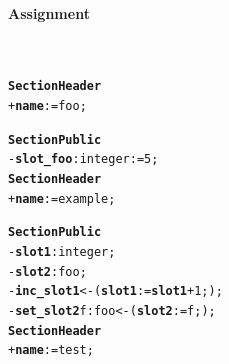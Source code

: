 \documentclass[11pt]{mybook}
\begin{document}
\paragraph{Assignment}  
~\\
\begin{alltt}
{\bf{}Section Header}
  + {\bf{}name} := {\sc{}foo};

{\bf{}Section Public}
  - {\bf{}slot\_foo}:{\sc{}integer} := 5;\\

{\bf{}Section Header}
  + {\bf{}name} := {\sc{}example};

{\bf{}Section Public}
  - {\bf{}slot1}:{\sc{}integer};
  - {\bf{}slot2}:{\sc{}foo};
  - {\bf{}inc\_slot1} <- ( {\bf{}slot1} := {\bf{}slot1} + 1; );
  - {\bf{}set\_slot2} f:{\sc{}foo} <- ( {\bf{}slot2} := f; );\\

{\bf{}Section Header}
  + {\bf{}name} := {\sc{}test};


\end{alltt}
\end{document}
